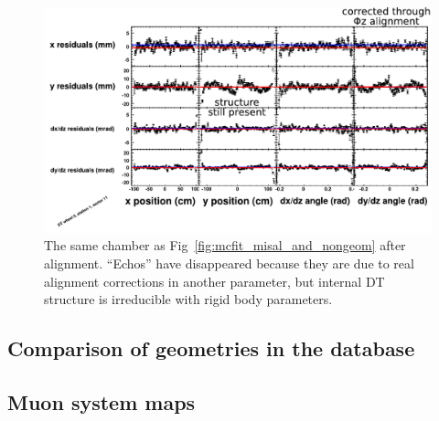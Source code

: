 \documentclass[12pt]{article}
\begin{document}
\begin{figure}
\includegraphics[width=\linewidth]{mcfit_misal_and_nongeom_aligned.pdf}
\caption{The same chamber as Fig~\ref{fig:mcfit_misal_and_nongeom}
  after alignment.  ``Echos'' have disappeared because they are due to
  real alignment corrections in another parameter, but internal DT
  structure is irreducible with rigid body
  parameters. \label{fig:mcfit_misal_and_nongeom_aligned}}
\end{figure}

\subsection{Comparison of geometries in the database}



\subsection{Muon system maps}
\end{document}
